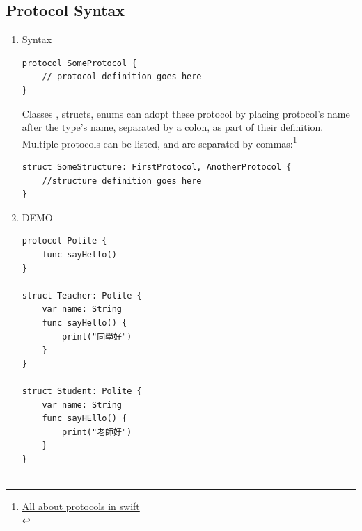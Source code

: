 \documentclass[a4paper,12pt]{article}
\begin{document}
\subsection{Protocol Syntax}
\label{sec:orgb26859a}
\begin{enumerate}
\item Syntax
\label{sec:orgae4ed44}
\lstset{breaklines=true,language=swift,label= ,caption= ,captionpos=b,firstnumber=1,numbers=left}
\begin{lstlisting}
protocol SomeProtocol {
    // protocol definition goes here
}
\end{lstlisting}
Classes , structs, enums can adopt these protocol by placing protocol’s name after the type’s name, separated by a colon, as part of their definition. Multiple protocols can be listed, and are separated by commas:\footnote{\href{https://abhimuralidharan.medium.com/all-about-protocols-in-swift-11a72d6ea354}{All about protocols in swift}\\}\\
\lstset{breaklines=true,language=swift,label= ,caption= ,captionpos=b,firstnumber=1,numbers=left}
\begin{lstlisting}
struct SomeStructure: FirstProtocol, AnotherProtocol {
    //structure definition goes here
}
\end{lstlisting}
\item DEMO
\label{sec:orgcd269a0}
\lstset{breaklines=true,language=swift,label= ,caption= ,captionpos=b,firstnumber=1,numbers=left}
\begin{lstlisting}
protocol Polite {
    func sayHello()
}

struct Teacher: Polite {
    var name: String
    func sayHello() {
        print("同學好")
    }
}

struct Student: Polite {
    var name: String
    func sayHEllo() {
        print("老師好")
    }
}


\end{lstlisting}
\end{enumerate}
\end{document}
